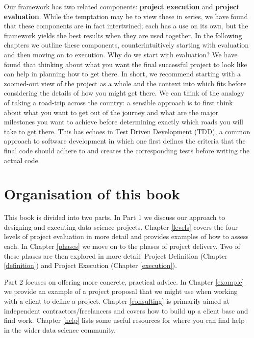 \documentclass[
]{book}
\begin{document}
Our framework has two related components: \textbf{project execution} and \textbf{project evaluation}. While the temptation may be to view these in series, we have found that these components are in fact intertwined; each has a use on its own, but the framework yields the best results when they are used together. In the following chapters we outline these components, counterintuitively starting with evaluation and then moving on to execution. Why do we start with evaluation? We have found that thinking about what you want the final successful project to look like can help in planning how to get there. In short, we recommend starting with a zoomed-out view of the project as a whole and the context into which fits before considering the details of how you might get there. We can think of the analogy of taking a road-trip across the country: a sensible approach is to first think about what you want to get out of the journey and what are the major milestones you want to achieve before determining exactly which roads you will take to get there. This has echoes in Test Driven Development (TDD), a common approach to software development in which one first defines the criteria that the final code should adhere to and creates the corresponding tests before writing the actual code.

\hypertarget{organisation-of-this-book}{%
\section{Organisation of this book}\label{organisation-of-this-book}}

This book is divided into two parts. In Part 1 we discuss our approach to designing and executing data science projects. Chapter \ref{levels} covers the four levels of project evaluation in more detail and provides examples of how to assess each. In Chapter \ref{phases} we move on to the phases of project delivery. Two of these phases are then explored in more detail: Project Definition (Chapter \ref{definition}) and Project Execution (Chapter \ref{execution}).

Part 2 focuses on offering more concrete, practical advice. In Chapter \ref{example} we provide an example of a project proposal that we might use when working with a client to define a project. Chapter \ref{consulting} is primarily aimed at independent contractors/freelancers and covers how to build up a client base and find work. Chapter \ref{help} lists some useful resources for where you can find help in the wider data science community.
\end{document}
